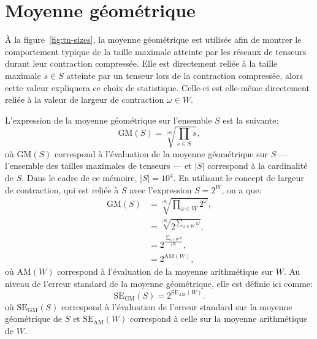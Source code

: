 \begin{comment}
\end{comment}

\appendix
\renewcommand\chapterstring{Annexe}
\chapter{Moyenne géométrique}\label{annexe:geo-mean}

À la figure~\ref{fig:tn-sizes}, la moyenne géométrique est utilisée afin de montrer le comportement typique de la taille maximale atteinte par les réseaux de tenseurs durant leur contraction compressée.
Elle est directement reliée à la taille maximale $s \in S$ atteinte par un tenseur lors de la contraction compressée, alors cette valeur expliquera ce choix de statistique.
Celle-ci est elle-même directement reliée à la valeur de largeur de contraction $\omega \in W$.

L'expression de la moyenne géométrique sur l'ensemble $S$ est la suivante:
\begin{equation}\label{eq:geo_mean}
    \mathrm{GM}(S) = \sqrt[|S|]{\prod_{s \in S} s},
\end{equation}
où $\mathrm{GM}(S)$ correspond à l'évaluation de la moyenne géométrique sur $S$ --- l'ensemble des tailles maximales de tenseurs --- et $|S|$ correspond à la cardinalité de $S$.
Dans le cadre de ce mémoire, $|S| = 10^4$.
En utilisant le concept de largeur de contraction, qui est reliée à $S$ avec l'expression $S = 2^W$, on a que:
\begin{equation}\label{eq:GM}
    \begin{split}
        \mathrm{GM}(S) &= \sqrt[|S|]{\prod_{\omega \in W} 2^{\omega}},\\
        &= \sqrt[|S|]{2^{\sum_{\omega \in W} \omega}},\\
        &= 2^\frac{\sum_{\omega \in W} \omega}{|S|},\\
        &= 2^{\mathrm{AM}(W)},
    \end{split}
\end{equation}
où $\mathrm{AM}(W)$ correspond à l'évaluation de la moyenne arithmétique sur $W$.
Au niveau de l'erreur standard de la moyenne géométrique, elle est définie ici comme:
\begin{equation}\label{eq:standard_error_geo_mean}
    \mathrm{SE}_\mathrm{GM}(S) = 2^{\mathrm{SE}_\mathrm{AM}(W)}.
\end{equation}
où $\mathrm{SE}_\mathrm{GM}(S)$ correspond à l'évaluation de l'erreur standard sur la moyenne géométrique de $S$ et $\mathrm{SE}_\mathrm{AM}(W)$ correspond à celle sur la moyenne arithmétique de $W$.

